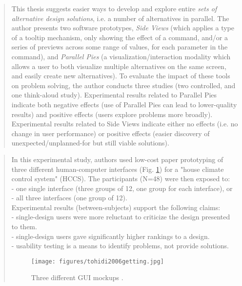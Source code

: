 		\begin{quote}
		\small
		This thesis suggests easier ways 
		to develop and explore entire {\em sets of alternative design
		solutions}, i.e. a number of alternatives in parallel.
		The author presents two software prototypes, 
		{\em Side Views} (which applies a type of a tooltip mechanism, only showing the
		effect of a command, and/or a series of previews across some range of values,
		for each parameter in the command), and
		{\em Parallel Pies} (a visualization/interaction modality which allows a user
		to both visualize multiple alternatives on the same screen, and easily create
		new alternatives). To evaluate the impact of these tools on problem solving,
		the author conducts three studies (two controlled, and one think-aloud study).
		Experimental results related to Parallel Pies indicate both negative effects
		(use of Parallel Pies can lead to lower-quality results) and positive effects 
		(users explore problems more broadly). 
		Experimental results related to Side Views indicate 
		either no effects (i.e. no change in user performance) or positive effects 
		(easier discovery of unexpected/unplanned-for but still viable solutions).
		\end{quote}


		\begin{quote}
		\small
		In this experimental study, authors used low-cost paper prototyping of three
		different human-computer interfaces (Fig. \ref{fig:tohidi2006getting}) 
		for a "house climate control system" (HCCS).
		The participants (N=48) were then exposed to:\\
		- one single interface (three groups of 12, one group for each interface), or\\
		- all three interfaces (one group of 12).\\
		Experimental results (between-subjects) support the following claims:\\
		- single-design users were more reluctant to criticize the design presented to them.\\
		- single-design users gave significantly higher rankings to a design.\\
		- usability testing is a means to identify problems, not provide solutions.
		\begin{figure}[htb]
		\begin{center}
		\texttt{[image: figures/tohidi2006getting.jpg]}
		\caption{Three different GUI mockups \cite{tohidi2006getting}.}
		\label{fig:tohidi2006getting}
		\end{center}
		\end{figure}
		\end{quote}

